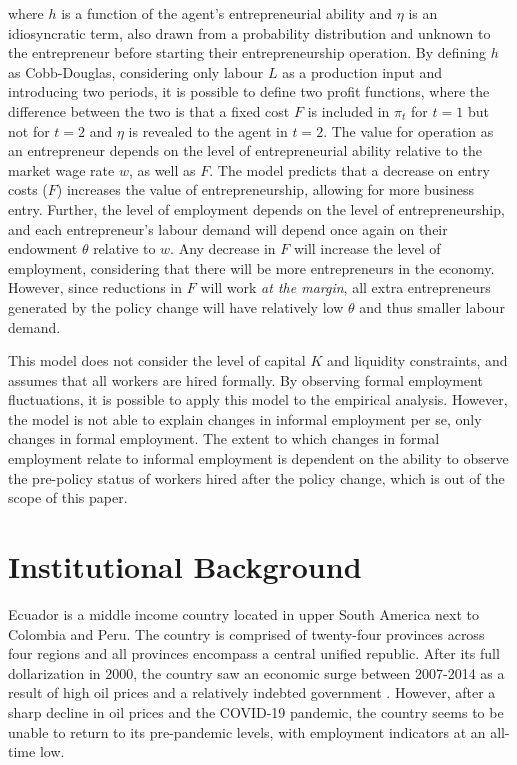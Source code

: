 \documentclass[11pt,a4paper]{article}\usepackage[]{graphicx}\usepackage[]{xcolor}
\begin{document}
where $h$ is a function of the agent's entrepreneurial ability and $\eta$ is an idiosyncratic term, also drawn from a probability distribution and unknown to the entrepreneur before starting their entrepreneurship operation. By defining $h$ as Cobb-Douglas, considering only labour $L$ as a production input and introducing two periods, it is possible to define two profit functions, where the difference between the two is that a fixed cost $F$ is included in $\pi_t$ for $t = 1$ but not for $t=2$ and $\eta$ is revealed to the agent in $t=2$. The value for operation as an entrepreneur depends on the level of entrepreneurial ability relative to the market wage rate $w$, as well as $F$. The model predicts that a decrease on entry costs ($F$) increases the value of entrepreneurship, allowing for more business entry. Further, the level of employment depends on the level of entrepreneurship, and each entrepreneur's labour demand will depend once again on their endowment $\theta$ relative to $w$. Any decrease in $F$ will increase the level of employment, considering that there will be more entrepreneurs in the economy. However, since reductions in $F$ will work \textit{at the margin}, all extra entrepreneurs generated by the policy change will have relatively low $\theta$ and thus smaller labour demand.

This model does not consider the level of capital $K$ and liquidity constraints, and assumes that all workers are hired formally. By observing formal employment fluctuations, it is possible to apply this model to the empirical analysis. However, the model is not able to explain changes in informal employment per se, only changes in formal employment. The extent to which changes in formal employment relate to informal employment is dependent on the ability to observe the pre-policy status of workers hired after the policy change, which is out of the scope of this paper.

\section{Institutional Background}

Ecuador is a middle income country located in upper South America next to Colombia and Peru. The country is comprised of twenty-four provinces across four regions and all provinces encompass a central unified republic. After its full dollarization in 2000, the country saw an economic surge between 2007-2014 as a result of high oil prices and a relatively indebted government \parencite{Weisbrot.2017}. However, after a sharp decline in oil prices and the COVID-19 pandemic, the country seems to be unable to return to its pre-pandemic levels, with employment indicators at an all-time low. 
\end{document}

